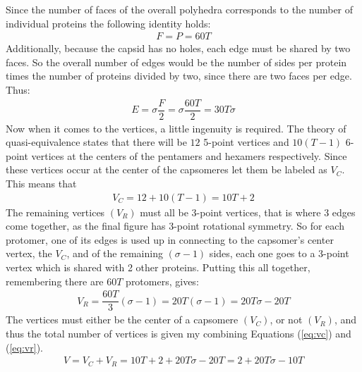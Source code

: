 \documentclass[12pt,letter]{article}
\begin{document}
Since the number of faces of the overall polyhedra corresponds to the number of individual proteins the following identity holds:
\begin{align}
	F = P = 60 T
	\label{eq:f}
\end{align}
%
Additionally, because the capsid has no holes, each edge must be shared by two faces. So the overall number of edges would be the number of sides per protein times the number of proteins divided by two, since there are two faces per edge. Thus:
\begin{align}
	E = \sigma \dfrac F 2 = \sigma \dfrac{60 T} {2} = 30 T \sigma
	\label{eq:e}
\end{align}
%
Now when it comes to the vertices, a little ingenuity is required. The theory of quasi-equivalence states that there will be $12$ 5-point vertices and $10(T-1)$ 6-point vertices at the centers of the pentamers and hexamers respectively. Since these vertices occur at the center of the capsomeres let them be labeled as $V_C$. This means that
\begin{align}
	V_C = 12 + 10(T - 1) = 10 T + 2
	\label{eq:vc}
\end{align}
%
The remaining vertices $(V_R)$ must all be 3-point vertices, that is where 3 edges come together, as the final figure has 3-point rotational symmetry. So for each protomer, one of its edges is used up in connecting to the capsomer's center vertex, the $V_C$, and of the remaining $(\sigma - 1)$ sides, each one goes to a 3-point vertex which is shared with 2 other proteins. Putting this all together, remembering there are $60 T$ protomers, gives:
\begin{align}
	V_R = \dfrac{60 T}{3} (\sigma - 1) = 20 T (\sigma - 1) = 20T\sigma - 20T
	\label{eq:vr}
\end{align}
%
The vertices must either be the center of a capsomere $(V_C)$, or not $(V_R)$, and thus the total number of vertices is given my combining Equations (\ref{eq:vc}) and (\ref{eq:vr}).
\begin{align}
	V = V_C + V_R = 10T + 2 + 20T\sigma - 20T = 2 + 20T\sigma - 10T
	\label{eq:v}
\end{align}
\end{document}
